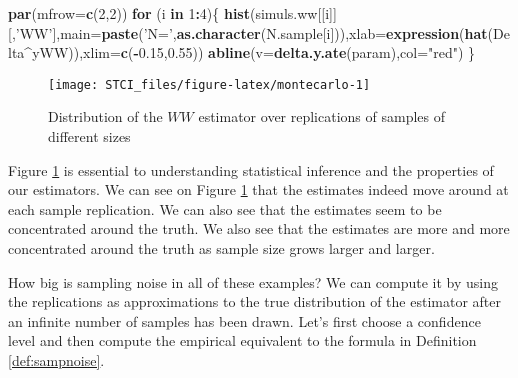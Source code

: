 \documentclass[]{book}
\newenvironment{Shaded}{\begin{snugshade}}{\end{snugshade}}
\newcommand{\ControlFlowTok}[1]{\textcolor[rgb]{0.13,0.29,0.53}{\textbf{#1}}}
\newcommand{\DataTypeTok}[1]{\textcolor[rgb]{0.13,0.29,0.53}{#1}}
\newcommand{\DecValTok}[1]{\textcolor[rgb]{0.00,0.00,0.81}{#1}}
\newcommand{\FloatTok}[1]{\textcolor[rgb]{0.00,0.00,0.81}{#1}}
\newcommand{\KeywordTok}[1]{\textcolor[rgb]{0.13,0.29,0.53}{\textbf{#1}}}
\newcommand{\NormalTok}[1]{#1}
\newcommand{\OperatorTok}[1]{\textcolor[rgb]{0.81,0.36,0.00}{\textbf{#1}}}
\newcommand{\StringTok}[1]{\textcolor[rgb]{0.31,0.60,0.02}{#1}}
\theoremstyle{definition}
\theoremstyle{definition}
\theoremstyle{definition}
\theoremstyle{remark}
\begin{document}
\begin{Shaded}
\begin{Highlighting}[]
\KeywordTok{par}\NormalTok{(}\DataTypeTok{mfrow=}\KeywordTok{c}\NormalTok{(}\DecValTok{2}\NormalTok{,}\DecValTok{2}\NormalTok{))}
\ControlFlowTok{for}\NormalTok{ (i }\ControlFlowTok{in} \DecValTok{1}\OperatorTok{:}\DecValTok{4}\NormalTok{)\{}
  \KeywordTok{hist}\NormalTok{(simuls.ww[[i]][,}\StringTok{'WW'}\NormalTok{],}\DataTypeTok{main=}\KeywordTok{paste}\NormalTok{(}\StringTok{'N='}\NormalTok{,}\KeywordTok{as.character}\NormalTok{(N.sample[i])),}\DataTypeTok{xlab=}\KeywordTok{expression}\NormalTok{(}\KeywordTok{hat}\NormalTok{(Delta}\OperatorTok{^}\NormalTok{yWW)),}\DataTypeTok{xlim=}\KeywordTok{c}\NormalTok{(}\OperatorTok{-}\FloatTok{0.15}\NormalTok{,}\FloatTok{0.55}\NormalTok{))}
  \KeywordTok{abline}\NormalTok{(}\DataTypeTok{v=}\KeywordTok{delta.y.ate}\NormalTok{(param),}\DataTypeTok{col=}\StringTok{"red"}\NormalTok{)}
\NormalTok{\}}
\end{Highlighting}
\end{Shaded}

\begin{figure}[htbp]

{\centering \texttt{[image: STCI\_files/figure-latex/montecarlo-1]} 

}

\caption{Distribution of the $WW$ estimator over replications of samples of different sizes}\label{fig:montecarlo}
\end{figure}

Figure \ref{fig:montecarlo} is essential to understanding statistical inference and the properties of our estimators.
We can see on Figure \ref{fig:montecarlo} that the estimates indeed move around at each sample replication.
We can also see that the estimates seem to be concentrated around the truth.
We also see that the estimates are more and more concentrated around the truth as sample size grows larger and larger.

How big is sampling noise in all of these examples?
We can compute it by using the replications as approximations to the true distribution of the estimator after an infinite number of samples has been drawn.
Let's first choose a confidence level and then compute the empirical equivalent to the formula in Definition \ref{def:sampnoise}.
\end{document}
